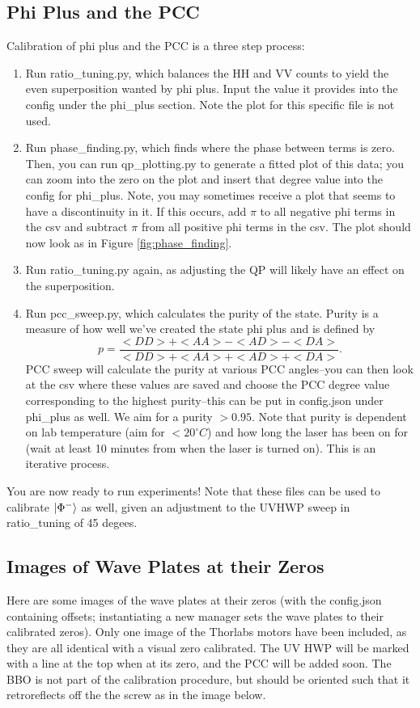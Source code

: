\documentclass{paper}[11pt]
\begin{document}
\subsection{Phi Plus and the PCC}
Calibration of phi plus and the PCC is a three step process:
\begin{enumerate}
    \item Run ratio\_tuning.py, which balances the HH and VV counts to yield the even superposition wanted by phi plus. Input the value it provides into the config under the phi\_plus section. Note the plot for this specific file is not used.
    \item Run phase\_finding.py, which finds where the phase between terms is zero. Then, you can run qp\_plotting.py to generate a fitted plot of this data; you can zoom into the zero on the plot and insert that degree value into the config for phi\_plus. Note, you may sometimes receive a plot that seems to have a discontinuity in it. If this occurs, add $\pi$ to all negative phi terms in the csv and subtract $\pi$ from all positive phi terms in the csv. The plot should now look as in Figure \ref{fig:phase_finding}.
    \item Run ratio\_tuning.py again, as adjusting the QP will likely have an effect on the superposition. 
    \item Run pcc\_sweep.py, which calculates the purity of the state. Purity is a measure of how well we've created the state phi plus and is defined by $$p = \frac{<DD> + <AA> - <AD> - <DA>}{<DD> + <AA> + <AD> + <DA>}.$$ PCC sweep will calculate the purity at various PCC angles--you can then look at the csv where these values are saved and choose the PCC degree value corresponding to the highest purity--this can be put in config.json under phi\_plus as well. We aim for a purity $>0.95$. Note that purity is dependent on lab temperature (aim for $<20^\circ C$) and how long the laser has been on for (wait at least 10 minutes from when the laser is turned on). This is an iterative process.
\end{enumerate}

You are now ready to run experiments! Note that these files can be used to calibrate $\ket{\Phi^-}$ as well, given an adjustment to the UVHWP sweep in ratio\_tuning of 45 degees. 

\subsection{Images of Wave Plates at their Zeros}
Here are some images of the wave plates at their zeros (with the config.json containing offsets; instantiating a new manager sets the wave plates to their calibrated zeros). Only one image of the Thorlabs motors have been included, as they are all identical with a visual zero calibrated. The UV HWP will be marked with a line at the top when at its zero, and the PCC will be added soon. The BBO is not part of the calibration procedure, but should be oriented such that it retroreflects off the the screw as in the image below.
\end{document}
